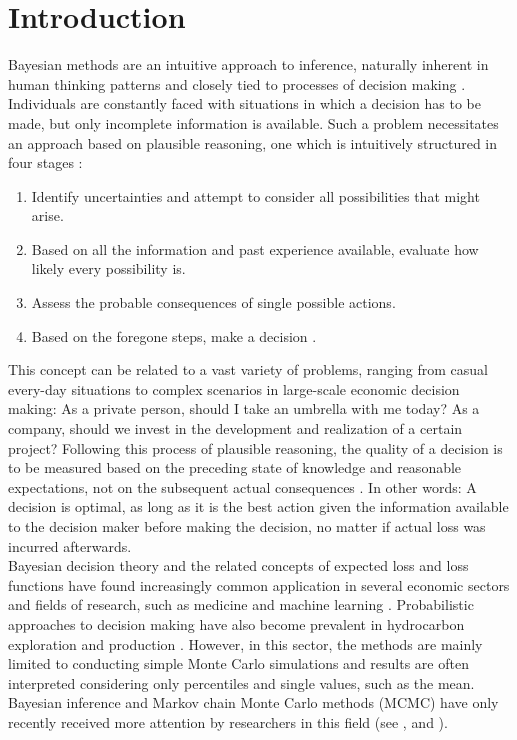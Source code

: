 \chapter{Introduction} \label{chap:intro}
Bayesian methods are an intuitive approach to inference, naturally inherent in human thinking patterns and closely tied to processes of decision making \citep{berger2013stat, davidson2015, jaynes1986bayesian}. Individuals are constantly faced with situations in which a decision has to be made, but only incomplete information is available. Such a problem necessitates an approach based on plausible reasoning, one which is intuitively structured in four stages \citep{jaynes1986bayesian}:
\begin{enumerate}
	\item Identify uncertainties and attempt to consider all possibilities that might arise.
	\item Based on all the information and past experience available, evaluate how likely every possibility is.
	\item Assess the probable consequences of single possible actions.
	\item Based on the foregone steps, make a decision \citep{jaynes1986bayesian}.
\end{enumerate}
This concept can be related to a vast variety of problems, ranging from casual every-day situations to complex scenarios in large-scale economic decision making: As a private person, should I take an umbrella with me today? As a company, should we invest in the development and realization of a certain project? Following this process of plausible reasoning, the quality of a decision is to be measured based on the preceding state of knowledge and reasonable expectations, not on the subsequent actual consequences \citep{jaynes1986bayesian}. In other words: A decision is optimal, as long as it is the best action given the information available to the decision maker before making the decision, no matter if actual loss was incurred afterwards.\\
Bayesian decision theory and the related concepts of expected loss and loss functions have found increasingly common application in several economic sectors and fields of research, such as medicine \citep{ashby2000evidence, ashby2006bayesian, moye2006statistical} and machine learning \citep{barber2012bayesian, theodoridis2015machine}. Probabilistic approaches to decision making have also become prevalent in hydrocarbon exploration and production \citep{murtha1997monte, mudford2000valuing,bratvold2010making}. However, in this sector, the methods are mainly limited to conducting simple Monte Carlo simulations and results are often interpreted considering only percentiles and single values, such as the mean. Bayesian inference and Markov chain Monte Carlo methods (MCMC) have only recently received more attention by researchers in this field (see \citet{wadsley2005markov}, \citet{ma2006multistage} and \citet{liu2010continuous}).\\
